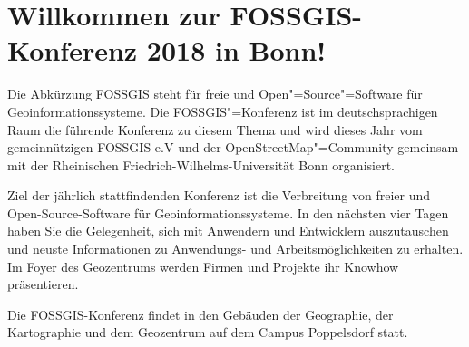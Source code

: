 \newpage
\section*{Willkommen zur FOSSGIS-Konferenz 2018 in Bonn!} \label{welcome}
Die Abkürzung FOSSGIS steht
für freie und Open"=Source"=Software für Geoinformationssysteme.
Die FOSSGIS"=Konferenz ist im deutschsprachigen Raum die führende Konferenz zu diesem Thema
und wird dieses Jahr vom gemeinnützigen FOSSGIS e.V und der OpenStreetMap"=Community
gemeinsam mit der Rheinischen Friedrich-Wilhelms-Universität Bonn organisiert.

Ziel der jährlich stattfindenden Konferenz ist die Verbreitung von freier und
Open-Source-Software für Geoinformationssysteme.  In den nächsten vier Tagen
haben Sie die Gelegenheit, sich mit Anwendern und Entwicklern auszutauschen und
neuste Informationen zu Anwendungs- und Arbeitsmöglichkeiten zu erhalten. Im
Foyer des Geozentrums werden Firmen und Projekte ihr Knowhow präsentieren.

Die FOSSGIS-Konferenz findet in den Gebäuden der Geographie, der Kartographie und dem Geozentrum auf dem Campus Poppelsdorf statt.

\newpage


